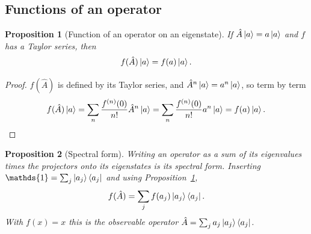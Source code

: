 \documentclass{article}
\newtheorem{proposition}{Proposition}
\newcommand{\id}{\mathds{1}}
\begin{document}
\subsection{Functions of an operator}
\begin{proposition}[Function of an operator on an eigenstate]
    \label{prop:function-eigenstate}
    If $\hat{A}\ket{a} = a\ket{a}$ and $f$ has a Taylor series, then
    \begin{equation}
        f(\hat{A})\ket{a} = f(a)\ket{a}.
    \end{equation}
\end{proposition}
\begin{proof}
    $f(\hat{A})$ is defined by its Taylor series, and $\hat{A}^n\ket{a} = a^n\ket{a}$, so term by term
    \[f(\hat{A})\ket{a} = \sum_{n}\frac{f^{(n)}(0)}{n!}\hat{A}^n\ket{a} = \sum_{n}\frac{f^{(n)}(0)}{n!}a^n\ket{a} = f(a)\ket{a}.\]
\end{proof}
\begin{proposition}[Spectral form]
    Writing an operator as a sum of its eigenvalues times the projectors onto its eigenstates is its spectral form. Inserting $\id = \sum_j\ket{a_j}\bra{a_j}$ and using Proposition~\ref{prop:function-eigenstate},
    \begin{equation}
        f(\hat{A}) = \sum_j f(a_j)\ket{a_j}\bra{a_j}.
    \end{equation}
    With $f(x) = x$ this is the observable operator $\hat{A} = \sum_j a_j\ket{a_j}\bra{a_j}$.
\end{proposition}
\end{document}
